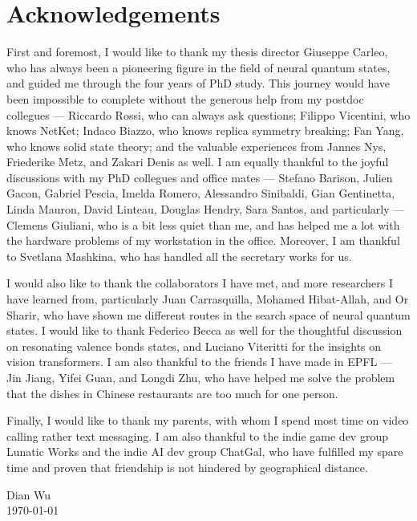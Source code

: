 \chapter*{Acknowledgements}

First and foremost, I would like to thank my thesis director Giuseppe Carleo, who has always been a pioneering figure in the field of neural quantum states, and guided me through the four years of PhD study.
This journey would have been impossible to complete without the generous help from my postdoc collegues --- Riccardo Rossi, who can always ask questions; Filippo Vicentini, who knows NetKet; Indaco Biazzo, who knows replica symmetry breaking; Fan Yang, who knows solid state theory; and the valuable experiences from Jannes Nys, Friederike Metz, and Zakari Denis as well.
I am equally thankful to the joyful discussions with my PhD collegues and office mates --- Stefano Barison, Julien Gacon, Gabriel Pescia, Imelda Romero, Alessandro Sinibaldi, Gian Gentinetta, Linda Mauron, David Linteau, Douglas Hendry, Sara Santos, and particularly --- Clemens Giuliani, who is a bit less quiet than me, and has helped me a lot with the hardware problems of my workstation in the office.
Moreover, I am thankful to Svetlana Mashkina, who has handled all the secretary works for us.

I would also like to thank the collaborators I have met, and more researchers I have learned from, particularly Juan Carrasquilla, Mohamed Hibat-Allah, and Or Sharir, who have shown me different routes in the search space of neural quantum states. I would like to thank Federico Becca as well for the thoughtful discussion on resonating valence bonds states, and Luciano Viteritti for the insights on vision transformers. I am also thankful to the friends I have made in EPFL --- Jin Jiang, Yifei Guan, and Longdi Zhu, who have helped me solve the problem that the dishes in Chinese restaurants are too much for one person.

Finally, I would like to thank my parents, with whom I spend most time on video calling rather text messaging. I am also thankful to the indie game dev group Lunatic Works and the indie AI dev group ChatGal, who have fulfilled my spare time and proven that friendship is not hindered by geographical distance.

\begin{flushright}
Dian Wu \\
\today
\end{flushright}
